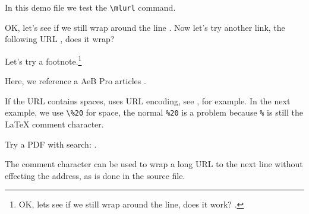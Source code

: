 \documentclass{article}
\begin{document}
In this demo file we test the \verb~\mlurl~ command.

OK, let's see if we still wrap around the line
. Now let's try another link, the following URL
, does it wrap?

Let's try a footnote.\footnote{OK, lets see if we still wrap around the line, does it work?
.}

Here, we reference a \textsf{AeB Pro} articles .

If the URL contains spaces, uses URL encoding, see , for example.
In the next example, we use \verb~\%20~ for space, the normal \texttt{\%20} is a problem because \texttt{\%}
is still the {\LaTeX} comment character.

Try a PDF with search: .

The comment character can be used to wrap a long URL to the next line without effecting the address,
as is done in the source file.
\end{document}
